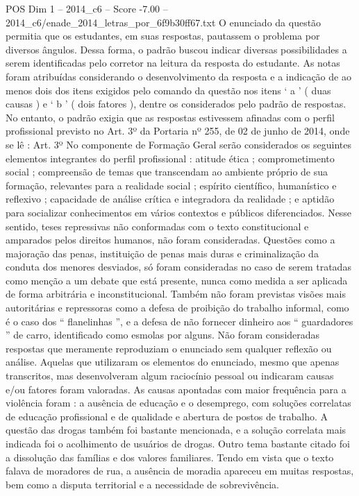 \begin{textsample}{POS Dim 1 – 2014\_c6 – Score -7.00 – 2014\_c6/enade\_2014\_letras\_por\_6f9b30ff67.txt}
O enunciado da questão permitia que os estudantes, em suas respostas, pautassem o problema por diversos ângulos.
Dessa forma, o padrão buscou indicar diversas possibilidades a serem identificadas pelo corretor na leitura da resposta do estudante.
As notas foram atribuídas considerando o desenvolvimento da resposta e a indicação de ao menos dois dos itens exigidos pelo comando da questão nos itens ‘ a ’ ( duas causas ) e ‘ b ’ ( dois fatores ), dentre os considerados pelo padrão de respostas.
No entanto, o padrão exigia que as respostas estivessem afinadas com o perfil profissional previsto no Art. 3º da Portaria nº 255, de 02 de junho de 2014, onde se lê : Art. 3º No componente de Formação Geral serão considerados os seguintes elementos integrantes do perfil profissional : atitude ética ; comprometimento social ; compreensão de temas que transcendam ao ambiente próprio de sua formação, relevantes para a realidade social ; espírito científico, humanístico e reflexivo ; capacidade de análise crítica e integradora da realidade ; e aptidão para socializar conhecimentos em vários contextos e públicos diferenciados.
Nesse sentido, teses repressivas não conformadas com o texto constitucional e amparados pelos direitos humanos, não foram consideradas.
Questões como a majoração das penas, instituição de penas mais duras e criminalização da conduta dos menores desviados, só foram consideradas no caso de serem tratadas como menção a um debate que está presente, nunca como medida a ser aplicada de forma arbitrária e inconstitucional.
Também não foram previstas visões mais autoritárias e repressoras como a defesa de proibição do trabalho informal, como é o caso dos “ flanelinhas ”, e a defesa de não fornecer dinheiro aos “ guardadores ” de carro, identificado como esmolas por alguns.
Não foram consideradas respostas que meramente reproduziam o enunciado sem qualquer reflexão ou análise.
Aquelas que utilizaram os elementos do enunciado, mesmo que apenas transcritos, mas desenvolveram algum raciocínio pessoal ou indicaram causas e/ou fatores foram valoradas.
As causas apontadas com maior frequência para a violência foram : a ausência de educação e o desemprego, com soluções correlatas de educação profissional e de qualidade e abertura de postos de trabalho.
A questão das drogas também foi bastante mencionada, e a solução correlata mais indicada foi o acolhimento de usuários de drogas.
Outro tema bastante citado foi a dissolução das famílias e dos valores familiares.
Tendo em vista que o texto falava de moradores de rua, a ausência de moradia apareceu em muitas respostas, bem como a disputa territorial e a necessidade de sobrevivência.

\end{textsample}
